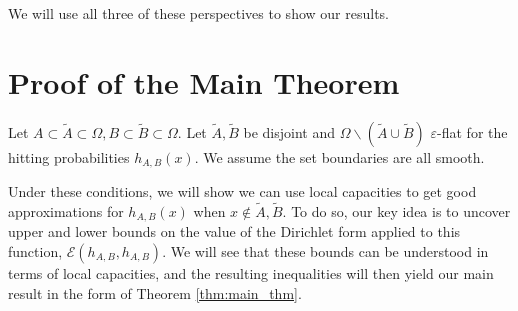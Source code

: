\documentclass[english, aip, jcp, priprint, graphicx,floatfix]{revtex4-1}
\theoremstyle{plain}
\theoremstyle{definition}
\theoremstyle{plain}
\begin{document}
  We will use all three of these perspectives to show our results.  


                                                       


\section{Proof of the Main Theorem}\label{sec:proof_thm}

Let $A\subset\tilde A\subset\Omega,B\subset\tilde B\subset\Omega$.  Let $\tilde A,\tilde B$ be disjoint and $\Omega \backslash (\tilde A \cup \tilde B)$ $\varepsilon$-flat for the hitting probabilities $h_{A,B}(x)$.  We assume the set boundaries are all smooth.  

Under these conditions, we will show we can use local capacities to get good approximations for $h_{A,B}(x)$ when $x\notin \tilde A,\tilde B$.  To do so, our key idea is to uncover upper and lower bounds on the value of the Dirichlet form applied to this function, $\mathcal{E}(h_{A,B},h_{A,B})$.  We will see that these bounds can be understood in terms of local capacities, and the resulting inequalities will then yield our main result in the form of Theorem \ref{thm:main_thm}.
\end{document}
